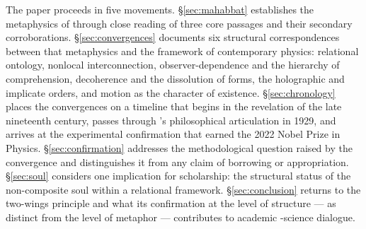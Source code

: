 The paper proceeds in five movements.
\S\ref{sec:mahabbat} establishes the \bahai metaphysics of \mahabbat through
close reading of three core passages and their secondary corroborations.
\S\ref{sec:convergences} documents six structural correspondences between that
metaphysics and the framework of contemporary physics: relational ontology,
nonlocal interconnection, observer-dependence and the hierarchy of
comprehension, decoherence and the dissolution of forms, the holographic and
implicate orders, and motion as the character of existence.
\S\ref{sec:chronology} places the convergences on a timeline that begins in
the \bahai revelation of the late nineteenth century, passes through
\citeauthor{Whitehead1929}'s philosophical articulation in 1929, and arrives
at the experimental confirmation that earned the 2022 Nobel Prize in Physics.
\S\ref{sec:confirmation} addresses the methodological question raised by the
convergence and distinguishes it from any claim of borrowing or appropriation.
\S\ref{sec:soul} considers one implication for \bahai scholarship: the
structural status of the non-composite soul within a relational framework.
\S\ref{sec:conclusion} returns to the two-wings principle and what its
confirmation at the level of structure --- as distinct from the level of
metaphor --- contributes to academic \bahai-science dialogue.
